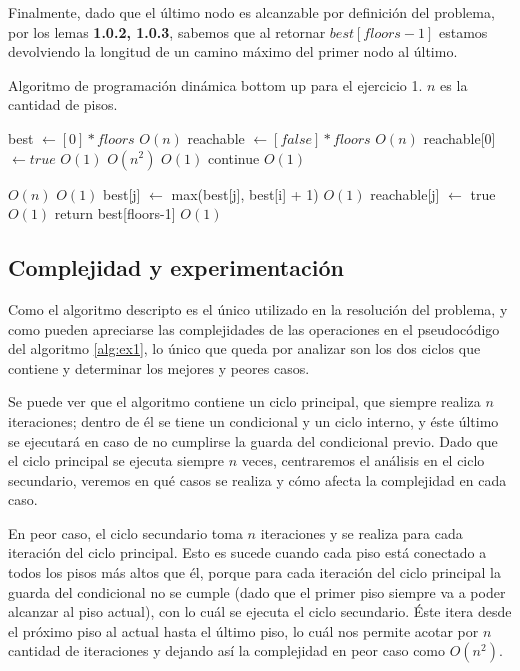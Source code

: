 \documentclass{article}
\theoremstyle{definition}
\theoremstyle{remark}
\begin{document}
Finalmente, dado que el último nodo es alcanzable por definición del problema, por los lemas \textbf{1.0.2, 1.0.3}, sabemos que al retornar $best[floors-1]$ estamos devolviendo la longitud de un camino máximo del primer nodo al último.

\begin{algorithm}[h!]
\caption{Algoritmo de programación dinámica bottom up para el ejercicio 1. $n$ es la cantidad de pisos.\label{alg:ex1}}

\begin{algorithmic}[h!]
\State best $\gets [0] * floors$ \Comment $O(n)$
\State reachable $\gets [false] * floors$ \Comment $O(n)$
\State reachable[0] $\gets true$ \Comment $O(1)$
 \Comment $O(n^2)$
     \Comment $O(1)$
        \State continue \Comment $O(1)$
    \EndIf
    
     \Comment $O(n)$
         \Comment $O(1)$
            \State best[j] $\gets$ max(best[j], best[i] + 1) \Comment $O(1)$
            \State reachable[j] $\gets$ true \Comment $O(1)$
        \EndIf    
    \EndFor
\EndFor
\State return best[floors-1] \Comment $O(1)$
\EndProcedure\\
\end{algorithmic}
\end{algorithm}

\subsection{Complejidad y experimentación}

Como el algoritmo descripto es el único utilizado en la resolución del problema, y como pueden apreciarse las complejidades de las operaciones en el pseudocódigo del algoritmo \ref{alg:ex1}, lo único que queda por analizar son los dos ciclos que contiene y determinar los mejores y peores casos.

Se puede ver que el algoritmo contiene un ciclo principal, que siempre realiza $n$ iteraciones; dentro de él se tiene un condicional y un ciclo interno, y éste último se ejecutará en caso de no cumplirse la guarda del condicional previo. Dado que el ciclo principal se ejecuta siempre $n$ veces, centraremos el análisis en el ciclo secundario, veremos en qué casos se realiza y cómo afecta la complejidad en cada caso.

En peor caso, el ciclo secundario toma $n$ iteraciones y se realiza para cada iteración del ciclo principal. Esto es sucede cuando cada piso está conectado a todos los pisos más altos que él, porque para cada iteración del ciclo principal la guarda del condicional no se cumple (dado que el primer piso siempre va a poder alcanzar al piso actual), con lo cuál se ejecuta el ciclo secundario. Éste itera desde el próximo piso al actual hasta el último piso, lo cuál nos permite acotar por $n$ cantidad de iteraciones y dejando así la complejidad en peor caso como $O(n^2)$.
\end{document}
